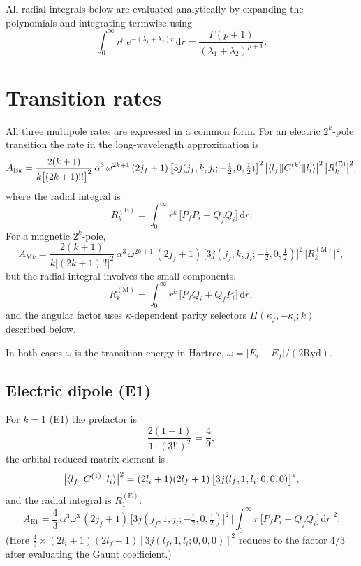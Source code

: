 \documentclass[11pt,a4paper]{article}
\newcommand{\E}{\mathrm{E}}
\newcommand{\M}{\mathrm{M}}
\newcommand{\dif}{\mathrm{d}}
\newcommand{\Ryd}{\mathrm{Ryd}}
\begin{document}
All radial integrals below are evaluated analytically by expanding the
polynomials and integrating termwise using
\begin{equation}
  \int_{0}^{\infty}\! r^{p}\,e^{-(\lambda_{1}+\lambda_{2})r}\,\dif r
  = \frac{\Gamma(p+1)}{(\lambda_{1}+\lambda_{2})^{p+1}}.
\end{equation}

\section{Transition rates}

All three multipole rates are expressed in a common form.  For an electric
$2^{k}$-pole transition the rate in the long-wavelength approximation is
\begin{equation}
  A_{\E k} = \frac{2(k+1)}{k\bigl[(2k+1)!!\bigr]^{2}}\,
    \alpha^{3}\,\omega^{2k+1}\,
    (2j_{f}+1)\,
    \bigl[3j(j_{f},k,j_{i};-\tfrac12,0,\tfrac12)\bigr]^{2}\,
    \bigl|\braket{l_{f}\|C^{(k)}\|l_{i}}\bigr|^{2}\,
    \bigl|R_{k}^{(\E)}\bigr|^{2},
    \label{eq:genE}
\end{equation}
where the radial integral is
\begin{equation}
  R_{k}^{(\E)} = \int_{0}^{\infty}\! r^{k}\,
    \bigl[P_{f}P_{i}+Q_{f}Q_{i}\bigr]\,\dif r.
\end{equation}
For a magnetic $2^{k}$-pole,
\begin{equation}
  A_{\M k} = \frac{2(k+1)}{k\bigl[(2k+1)!!\bigr]^{2}}\,
    \alpha^{3}\,\omega^{2k+1}\,
    (2j_{f}+1)\,
    \bigl[3j(j_{f},k,j_{i};-\tfrac12,0,\tfrac12)\bigr]^{2}\,
    \bigl|R_{k}^{(\M)}\bigr|^{2},
    \label{eq:genM}
\end{equation}
but the radial integral involves the small components,
\begin{equation}
  R_{k}^{(\M)} = \int_{0}^{\infty}\! r^{k}\,
    \bigl[P_{f}Q_{i}+Q_{f}P_{i}\bigr]\,\dif r,
\end{equation}
and the angular factor uses $\kappa$-dependent parity selectors
$\Pi(\kappa_{f},-\kappa_{i};k)$ described below.

In both cases $\omega$ is the transition energy in Hartree,
$\omega = |E_{i}-E_{f}| / (2\Ryd)$.

\subsection{Electric dipole (E1)}

For $k=1$ (E1) the prefactor is
\[
\frac{2(1+1)}{1\cdot(3!!)^{2}} = \frac{4}{9},
\]
the orbital reduced matrix element is
\[
\bigl|\braket{l_{f}\|C^{(1)}\|l_{i}}\bigr|^{2}
  = (2l_{i}+1)(2l_{f}+1)\,
    \bigl[3j(l_{f},1,l_{i};0,0,0)\bigr]^{2},
\]
and the radial integral is $R_{1}^{(\E)}$:
\begin{equation}
  A_{\E1} = \frac{4}{3}\,\alpha^{3}\omega^{3}\,
    (2j_{f}+1)\,
    \bigl[3j(j_{f},1,j_{i};-\tfrac12,0,\tfrac12)\bigr]^{2}\,
    \biggl|\int_{0}^{\infty}\! r\,
      \bigl[P_{f}P_{i}+Q_{f}Q_{i}\bigr]\,\dif r\biggr|^{2}.
  \label{eq:e1}
\end{equation}
(Here $\frac{4}{9}\times(2l_{i}+1)(2l_{f}+1)[3j(l_{f},1,l_{i};0,0,0)]^{2}$
reduces to the factor $4/3$ after evaluating the Gaunt coefficient.)
\end{document}
